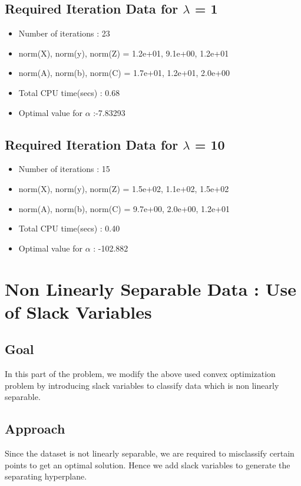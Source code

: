 \documentclass[english]{article}
\begin{document}
\subsection{Required Iteration Data for $\lambda$ = 1}
\begin{itemize}
	\item Number of iterations : 23
	\item  norm(X), norm(y), norm(Z) = 1.2e+01, 9.1e+00, 1.2e+01
 	\item norm(A), norm(b), norm(C) = 1.7e+01, 1.2e+01, 2.0e+00
 	\item Total CPU time(secs) : 0.68
 	\item Optimal value for $\alpha$ :-7.83293
 \end{itemize}

 \subsection{Required Iteration Data for $\lambda$ = 10}
\begin{itemize}
	\item Number of iterations : 15
	\item  norm(X), norm(y), norm(Z) = 1.5e+02, 1.1e+02, 1.5e+02
 	\item norm(A), norm(b), norm(C) = 9.7e+00, 2.0e+00, 1.2e+01
 	\item Total CPU time(secs) : 0.40
 	\item Optimal value for $\alpha$ : -102.882
 \end{itemize}

\section{Non Linearly Separable Data : Use of Slack Variables}
\subsection{Goal}
In this part of the problem, we modify the above used convex optimization problem by introducing slack variables to classify data which is non linearly separable. 
\subsection{Approach}
Since the dataset is not linearly separable, we are required to misclassify certain points to get an optimal solution. Hence we add slack variables to generate the separating hyperplane.
\end{document}

